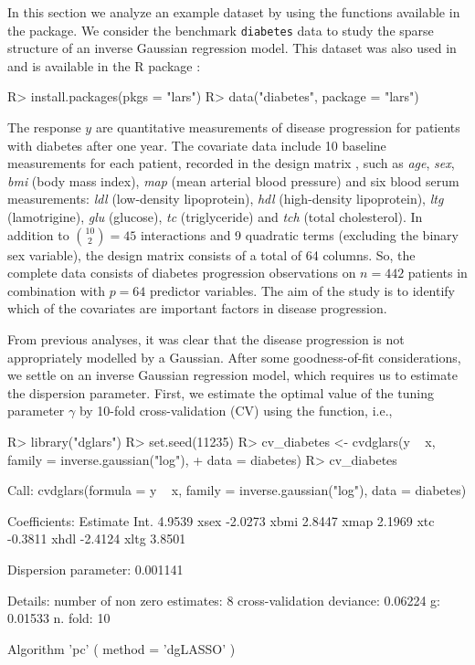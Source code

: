 In this section we analyze an example dataset by using the functions available in the  package. We consider the benchmark \texttt{diabetes} data  \citep{efron04} to study the sparse structure of an inverse Gaussian regression model. This dataset was also used in \cite{ish10a} and is  available in the {R} package :
%
\begin{example}
R> install.packages(pkgs = "lars")
R> data("diabetes", package = "lars")
\end{example}
%
The response $y$ are quantitative measurements of disease progression for patients with diabetes after one year. The covariate data include 10 baseline measurements for each patient, recorded in the design matrix , such as \textit{age}, \textit{sex}, \textit{bmi} (body mass index), \textit{map} (mean arterial blood pressure) and six blood serum measurements: \textit{ldl} (low-density lipoprotein), \textit{hdl} (high-density lipoprotein), \textit{ltg} (lamotrigine), \textit{glu} (glucose), \textit{tc} (triglyceride) and \textit{tch} (total cholesterol). In addition to $\binom{10}{2} = 45$ interactions and 9 quadratic terms (excluding the binary sex variable), the design matrix  consists of a total of 64 columns. So, the complete data consists of  diabetes progression observations on $n=442$ patients in combination with $p=64$ predictor variables.  The aim of the study is to identify which of the covariates are important factors in disease progression. 


From previous analyses, it was clear that the disease progression is not appropriately modelled by a Gaussian. After some goodness-of-fit considerations, we settle on an inverse Gaussian regression model, which requires us to estimate the dispersion parameter. First, we estimate the optimal value of the tuning parameter $\gamma$ by 10-fold cross-validation (CV) using the  function, i.e.,

\begin{example}
R> library("dglars")
R> set.seed(11235)
R> cv_diabetes <- cvdglars(y ~ x, family = inverse.gaussian("log"), 
+                          data = diabetes)
R> cv_diabetes

Call:  cvdglars(formula = y ~ x, family = inverse.gaussian("log"), data = diabetes)

Coefficients:
     Estimate
Int.   4.9539
xsex  -2.0273
xbmi   2.8447
xmap   2.1969
xtc   -0.3811
xhdl  -2.4124
xltg   3.8501

Dispersion parameter: 0.001141

Details:
   number of non zero estimates: 8
      cross-validation deviance: 0.06224
                              g: 0.01533
                        n. fold: 10

Algorithm 'pc' ( method = 'dgLASSO' )
\end{example}

